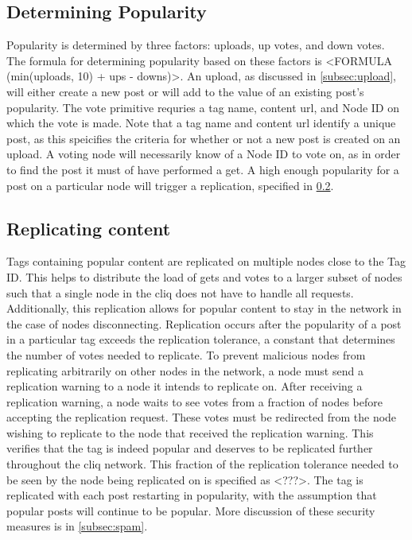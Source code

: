 \documentclass{sig-alternate}
\begin{document}
\subsection{Determining Popularity}
\label{subsec:popularity}

Popularity is determined by three factors: uploads, up votes, and down votes. 
The formula for determining popularity based on these factors is <FORMULA (min(uploads, 10) + ups - downs)>.
An upload, as discussed in \ref{subsec:upload}, will either create a new post or will add to the value of an existing post's popularity. 
The vote primitive requries a tag name, content url, and Node ID on which the vote is made. 
Note that a tag name and content url identify a unique post, as this speicifies the criteria for whether or not a new post is created on an upload. 
A voting node will necessarily know of a Node ID to vote on, as in order to find the post it must of have performed a get. 
A high enough popularity for a post on a particular node will trigger a replication, specified in \ref{subsec:replication}. 

\subsection{Replicating content}
\label{subsec:replication}

Tags containing popular content are replicated on multiple nodes close to the Tag ID. 
This helps to distribute the load of gets and votes to a larger subset of nodes such that a single node in the cliq does not have to handle all requests. 
Additionally, this replication allows for popular content to stay in the network in the case of nodes disconnecting. 
Replication occurs after the popularity of a post in a particular tag exceeds the replication tolerance, a constant that determines the number of votes needed to replicate. 
To prevent malicious nodes from replicating arbitrarily on other nodes in the network, a node must send a replication warning to a node it intends to replicate on. 
After receiving a replication warning, a node waits to see votes from a fraction of nodes before accepting the replication request. 
These votes must be redirected from the node wishing to replicate to the node that received the replication warning. 
This verifies that the tag is indeed popular and deserves to be replicated further throughout the cliq network. 
This fraction of the replication tolerance needed to be seen by the node being replicated on is specified as <???>. 
The tag is replicated with each post restarting in popularity, with the assumption that popular posts will continue to be popular. 
More discussion of these security measures is in \ref{subsec:spam}. 
\end{document}
